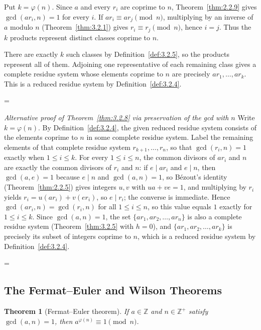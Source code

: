 \documentclass[11pt]{article}
\makeatletter
\theoremstyle{ntstyle}
\newtheorem{theorem}{Theorem}[subsection]
\let\nt@closedisplay\]
\def\nt@guardedclose{\@ifnextchar\par{\nt@closeafterpar}{\@ifnextchar\end{\postdisplaypenalty\@M\nt@closedisplay}{\nt@closedisplay}}}
\def\nt@closeafterpar\par{\@ifnextchar\par{\nt@closeafterpar}{\@ifnextchar\end{\postdisplaypenalty\@M\nt@closedisplay\par}{\nt@closedisplay\par}}}
\renewenvironment{proof}[1][\proofname]{\par
  \pushQED{\qed}\normalfont\topsep\medskipamount\edef\nt@afterproof{\@endparpenalty=\the\@endparpenalty\relax}\@beginparpenalty\@M\@endparpenalty\@M\let\]\nt@guardedclose\trivlist\item[]\textit{#1\@addpunct{.}} \ignorespaces}{\ifvmode\addpenalty\@M\fi\popQED\nt@afterproof\endtrivlist\@endpefalse}
\newenvironment{altproof}[1][\proofname]{\begin{proof}[#1]\renewcommand{\qedsymbol}{}}{\end{proof}}
\makeatother
\begin{document}
\begin{proof}
Put $k=\varphi(n)$. Since $a$ and every $r_i$ are coprime to $n$,
    Theorem~\ref{thm:2.2.9} gives $\gcd(ar_i,n)=1$ for every $i$.
    If $ar_i\equiv ar_j\pmod n$, multiplying by an inverse of $a$ modulo $n$
    (Theorem~\ref{thm:3.2.1}) gives $r_i\equiv r_j\pmod n$, hence $i=j$. Thus the $k$ products represent
    distinct classes coprime to $n$.

    There are exactly $k$ such classes by Definition~\ref{def:3.2.5}, so
    the products represent all of them. Adjoining one representative
    of each remaining class gives a complete residue system whose
    elements coprime to $n$ are precisely $ar_1,\ldots,ar_k$.
    This is a reduced residue system by Definition~\ref{def:3.2.4}.

\end{proof}
\begin{altproof}[Alternative proof of Theorem~\ref{thm:3.2.8} via preservation of the gcd with $n$] Write $k=\varphi(n)$. By Definition~\ref{def:3.2.4}, the
	given reduced residue system consists of the elements coprime to $n$
	in some complete residue system. Label the remaining elements of that complete residue system
	$r_{k+1},\ldots,r_n$, so that $\gcd(r_i,n)=1$ exactly when $1\le i\le k$. For every $1 \le i \le n$, the common
	divisors of $ar_i$ and $n$ are exactly the common divisors of $r_i$
	and $n$: if $e\mid ar_i$ and $e\mid n$, then $\gcd(a, e)=1$ because
	$e\mid n$ and $\gcd(a, n)=1$, so B{\'e}zout's identity (Theorem~\ref{thm:2.2.5})
	gives integers $u,v$ with
	$ua+ve=1$, and multiplying by $r_i$ yields $r_i=u(ar_i)+v(er_i)$, so
	$e\mid r_i$; the converse is immediate. Hence $\gcd(ar_i, n) =
		\gcd(r_i, n)$ for all $1 \le i \le n$, so this value equals $1$
	exactly for $1 \le i \le k$. Since $\gcd(a, n)=1$, the set $\{a
		r_1, a r_2, \ldots, a r_n\}$ is also a complete residue system
	(Theorem~\ref{thm:3.2.5} with $h = 0$), and $\{a r_1, a r_2, \ldots, a r_k\}$ is
	precisely
	its subset of integers coprime to $n$, which is a reduced residue
	system by Definition~\ref{def:3.2.4}.

\end{altproof}
\subsection{The Fermat--Euler and Wilson Theorems}

\begin{theorem}[Fermat--Euler theorem]\label{thm:3.3.1} If $a \in \mathbb{Z}$
	and $n \in \mathbb{Z}^+$ satisfy $\gcd(a, n)=1$, then $a^{\varphi(n)} \equiv
		1 \pmod{n}$.

\end{theorem}
\end{document}

